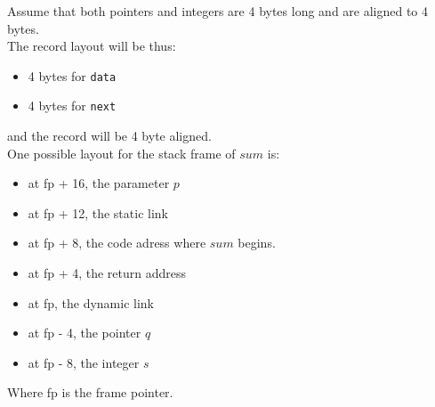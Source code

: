 Assume that both pointers and integers are 4 bytes long and are aligned to 4 bytes. \\
The record layout will be thus:
\begin{itemize}
\item 4 bytes for \texttt{data}
\item 4 bytes for \texttt{next}
\end{itemize}
and the record will be 4 byte aligned. \\

One possible layout for the stack frame of $sum$ is:

\begin{itemize}
\item at fp + 16, the parameter $p$
\item at fp + 12, the static link
\item at fp + 8, the code adress where $sum$ begins.
\item at fp + 4, the return address
\item at fp, the dynamic link
\item at fp - 4, the pointer $q$
\item at fp - 8, the integer $s$
\end{itemize}

Where fp is the frame pointer.
